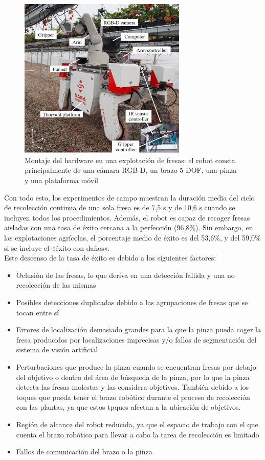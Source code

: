 \begin{figure} [H]
    \begin{center}
      \includegraphics[width=8cm]{figs/Hardware assembly in a strawberry farm.jpg}
    \end{center}
    \caption{Montaje del hardware en una explotación de fresas: el robot consta principalmente de una cámara RGB-D, un brazo 5-DOF, una pinza y una plataforma móvil}
    \label{fig:Robot_Xiong}
\end{figure}

Con todo esto, los experimentos de campo muestran la duración media del ciclo de recolección continua de una sola fresa es de 7,5 s y de 10,6 s cuando se incluyen todos los procedimientos. Además, el robot es capaz de recoger fresas aisladas con una tasa de éxito cercana a la perfección (96,8\%). Sin embargo, en las explotaciones agrícolas, el porcentaje medio de éxito es del 53,6\%, y del 59,0\% si se incluye el «éxito con daños». \\

Este descenso de la tasa de éxito es debido a los siguientes factores:

\begin{itemize}
    \item Oclusión de las fresas, lo que deriva en una detección fallida y una no recolección de las mismas
    \item Posibles detecciones duplicadas debido a las agrupaciones de fresas que se tocan entre sí
    \item Errores de localización demasiado grandes para la que la pinza pueda coger la fresa producidos por localizaciones imprecisas y/o fallos de segmentación del sistema de visión artificial
    \item Perturbaciones que produce la pinza cuando se encuentran fresas por debajo del objetivo o dentro del área de búsqueda de la pinza, por lo que la pinza detecta las fresas molestas y las considera objetivos. También debido a los toques que pueda tener el brazo robótico durante el proceso de recolección con las plantas, ya que estos tpques afectan a la ubicación de objetivos.
    \item Región de alcance del robot reducida, ya que el espacio de trabajo con el que cuenta el brazo robótico para llevar a cabo la tarea de recolección es limitado
    \item Fallos de comunicación del brazo o la pinza
\end{itemize}

